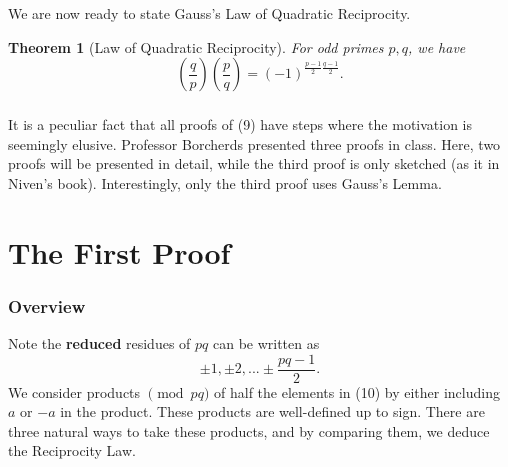 \documentclass{article}
\newtheorem{theorem}{Theorem}
\newcommand{\legendre}[2]{\genfrac{(}{)}{}{}{#1}{#2}}
\begin{document}
\subsubsection{}
We are now ready to state Gauss's Law of Quadratic Reciprocity.
\begin{theorem}[Law of Quadratic Reciprocity]
For odd primes $p, q$, we have
\begin{equation}
    \legendre{q}{p}\legendre{p}{q} = (-1)^{\frac{p-1}{2}\frac{q-1}{2}}.
\end{equation}
\end{theorem}
\subsubsection{}
It is a peculiar fact that all proofs of (9) have steps where the motivation is seemingly elusive. Professor Borcherds presented three proofs in class. Here, two proofs will be presented in detail, while the third proof is only sketched (as it in Niven's book). Interestingly, only the third proof uses Gauss's Lemma.

\section{The First Proof}
\subsubsection{Overview}
Note the \textbf{reduced} residues of $pq$ can be written as
\begin{equation}
    {\pm1, \pm2, ... \pm \frac{pq-1}{2}}.
\end{equation}
We consider products $\pmod{pq}$ of half the elements in (10) by either including $a$ or $-a$ in the product. These products are well-defined up to sign. There are three natural ways to take these products, and by comparing them, we deduce the Reciprocity Law.
\end{document}
